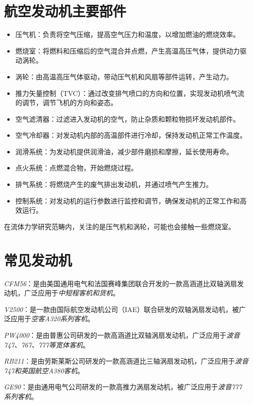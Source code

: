 \documentclass{MyLatex}
\begin{document}
\section{航空发动机主要部件}


\begin{itemize}
  \item 压气机：负责将空气压缩，提高空气压力和温度，以增加燃油的燃烧效率。
  \item 燃烧室：将燃料和压缩后的空气混合并点燃，产生高温高压气体，提供动力驱动涡轮。
  \item 涡轮：由高温高压气体驱动，带动压气机和风扇等部件运转，产生动力。
  \item 推力矢量控制（TVC）：通过改变排气喷口的方向和位置，实现发动机喷气流的调节，调节飞机的方向和姿态。
  \item 空气滤清器：过滤进入发动机的空气，防止杂质和颗粒物损坏发动机部件。
  \item 空气冷却器：对发动机内部的高温部件进行冷却，保持发动机正常工作温度。
  \item 润滑系统：为发动机提供润滑油，减少部件磨损和摩擦，延长使用寿命。
  \item 点火系统：点燃混合物，开始燃烧过程。
  \item 排气系统：将燃烧产生的废气排出发动机，并通过喷气产生推力。
  \item 控制系统：对发动机的运行参数进行监控和调节，确保发动机的正常工作和高效运行。
\end{itemize}

在流体力学研究范畴内，关注的是压气机和涡轮，可能也会接触一些燃烧室。

\section{常见发动机}

\emph{CFM56}：是由美国通用电气和法国赛峰集团联合开发的一款高涵道比双轴涡扇发动机，广泛应用于\emph{中短程客机和货机}。

\emph{V2500}：是一款由国际航空发动机公司（IAE）联合研发的双轴涡扇发动机，被广泛应用于\emph{空客A320系列客机}。

\emph{PW4000}：是由普惠公司研发的一款高涵道比双轴涡扇发动机，广泛应用于\emph{波音747、767、777等宽体客机}。

\emph{RB211}：是由劳斯莱斯公司研发的一款高涵道比三轴涡扇发动机，广泛应用于\emph{波音747和英国航空A380客机}。

\emph{GE90}：是由通用电气公司研发的一款高推力涡扇发动机，被广泛应用于\emph{波音777系列客机}。
\end{document}

